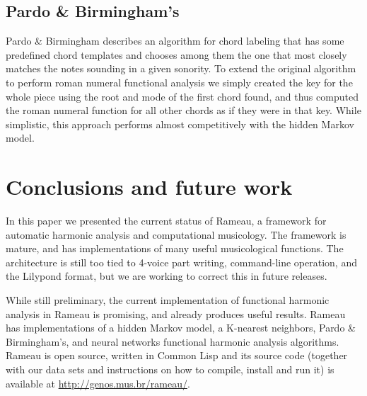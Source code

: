 \subsection{Pardo \& Birmingham's}
\label{sec:pardo--birminghams}

Pardo \& Birmingham \cite{pardo.ea99:automated} describes an algorithm
for chord labeling that has some predefined chord templates and
chooses among them the one that most closely matches the notes
sounding in a given sonority. To extend the original algorithm to
perform roman numeral functional analysis we simply created the key
for the whole piece using the root and mode of the first chord found,
and thus computed the roman numeral function for all other chords as
if they were in that key. While simplistic, this approach performs
almost competitively with the hidden Markov model.

\section{Conclusions and future work}
\label{sec:concl-future-work}

In this paper we presented the current status of Rameau, a framework
for automatic harmonic analysis and computational musicology. The
framework is mature, and has implementations of many useful
musicological functions. The architecture is still too tied to 4-voice
part writing, command-line operation, and the Lilypond format, but we
are working to correct this in future releases.

While still preliminary, the current implementation of functional
harmonic analysis in Rameau is promising, and already produces useful
results. Rameau has implementations of a hidden Markov model, a
K-nearest neighbors, Pardo \& Birmingham's, and neural networks
functional harmonic analysis algorithms. Rameau is open source,
written in Common Lisp and its source code (together with our data
sets and instructions on how to compile, install and run it) is
available at \url{http://genos.mus.br/rameau/}.

